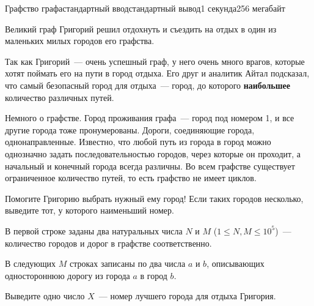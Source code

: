 \begin{problem}{Графство графа}{стандартный ввод}{стандартный вывод}{1 секунда}{256 мегабайт}

Великий граф Григорий решил отдохнуть и съездить на отдых в один из маленьких милых городов его графства. 

Так как Григорий~--- очень успешный граф, у него очень много врагов, которые хотят поймать его на пути в город отдыха. Его друг и аналитик Айтал подсказал, что самый безопасный город для отдыха~--- город, до которого \textbf{наибольшее} количество различных путей.

Немного о графстве. Город проживания графа~--- город под номером 1, и все другие города тоже пронумерованы. Дороги, соединяющие города, однонаправленные. Известно, что любой путь из города в город можно однозначно задать последовательностью городов, через которые он проходит, а начальный и конечный города всегда различны. Во всем графстве  существует ограниченное количество путей, то есть графство не имеет циклов.

Помогите Григорию выбрать нужный ему город! Если таких городов несколько, выведите тот, у которого наименьший номер.

\InputFile
В первой строке заданы два натуральных числа $N$ и $M$ ($1 \leq N, M \leq 10^5$)~--- количество городов и дорог в графстве соответственно.

В следующих $M$ строках записаны по два числа $a$ и $b$, описывающих одностороннюю дорогу из города $a$ в город $b$.

\OutputFile
Выведите одно число $X$~--- номер лучшего города для отдыха Григория.

\Examples

\begin{example}
%
%
\end{example}

\end{problem}

